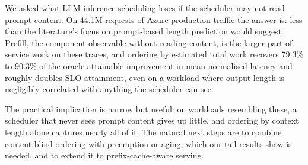 \documentclass[conference,10pt,letterpaper]{IEEEtran}
\begin{document}
We asked what LLM inference scheduling loses if the scheduler may not read
prompt content. On 44.1M requests of Azure production traffic the answer is:
less than the literature's focus on prompt-based length prediction would
suggest. Prefill, the component observable without reading content, is the
larger part of service work on these traces, and ordering by estimated total
work recovers 79.3\% to 90.3\% of the oracle-attainable improvement in mean
normalised latency and roughly doubles SLO attainment, even on a workload where
output length is negligibly correlated with anything the scheduler can see.

The practical implication is narrow but useful: on workloads resembling these, a
scheduler that never sees prompt content gives up little, and ordering by
context length alone captures nearly all of it. The natural next steps are to
combine content-blind ordering with preemption or aging, which our tail results
show is needed, and to extend it to prefix-cache-aware serving.



\end{document}
